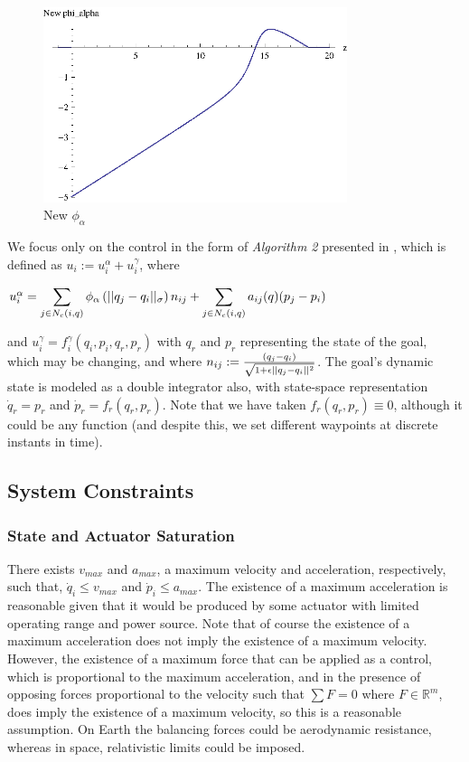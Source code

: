 \documentclass[10pt, conference, compsocconf]{IEEEtran}
\begin{document}
\begin{figure}[!b]
  \begin{center}
    \includegraphics[width=3.5in]{phiAlphaNew}
  \end{center}

  \caption{\small New $\phi_{\alpha}$}
  \label{fig:newPhiAlpha}
\end{figure}

We focus only on the control in the form of \textit{Algorithm 2} presented in \cite{os2006}, which is defined as $u_i := u_i^\alpha + u_i^\gamma$, where

$u_i^\alpha = \displaystyle\sum_{j \in N_c(i,q)}{\phi_{\alpha}\left(\lvert\lvert q_j - q_i\rvert\rvert_{\sigma}\right)n_{ij}} + \displaystyle\sum_{j \in N_c(i,q)}{a_{ij}(q)(p_j - p_i)}$

and
%
$u_i^\gamma = f_i^{\gamma}(q_i, p_i, q_r, p_r)$ with $q_r$ and $p_r$ representing the state of the goal, which may be changing, and where $n_{ij} := \frac{\left(q_j - q_i\right)}{\sqrt{1 + \epsilon \lvert\lvert q_j - q_i\rvert\rvert^2}}$.
%
The goal's dynamic state is modeled as a double integrator also, with state-space representation $\dot{q}_r = p_r$ and $\dot{p}_r = f_r(q_r, p_r)$.
%
Note that we have taken $f_r(q_r, p_r) \equiv 0$, although it could be any function (and despite this, we set different waypoints at discrete instants in time).

\subsection{System Constraints}
\label{sec:constraints}

\subsubsection{State and Actuator Saturation}

There exists $v_{max}$ and $a_{max}$, a maximum velocity and acceleration, respectively, such that, $\dot{q}_{i} \leq v_{max}$ and $\dot{p}_{i} \leq a_{max}$.
%
The existence of a maximum acceleration is reasonable given that it would be produced by some actuator with limited operating range and power source.
%
Note that of course the existence of a maximum acceleration does not imply the existence of a maximum velocity.
%
However, the existence of a maximum force that can be applied as a control, which is proportional to the maximum acceleration, and in the presence of opposing forces proportional to the velocity such that $\sum{F}=0$ where $F \in \mathbb{R}^m$, does imply the existence of a maximum velocity, so this is a reasonable assumption.
%
On Earth the balancing forces could be aerodynamic resistance, whereas in space, relativistic limits could be imposed.
\end{document}
